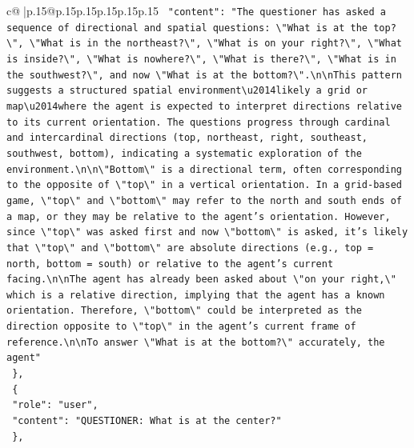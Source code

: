 \documentclass{article}
\begin{document}
{\begin{supertabular}{c@{$\;$}|p{.15\linewidth}@{}p{.15\linewidth}p{.15\linewidth}p{.15\linewidth}p{.15\linewidth}p{.15\linewidth}}
{{{\texttt{    "content": "The questioner has asked a sequence of directional and spatial questions: \textbackslash{}"What is at the top?\textbackslash{}", \textbackslash{}"What is in the northeast?\textbackslash{}", \textbackslash{}"What is on your right?\textbackslash{}", \textbackslash{}"What is inside?\textbackslash{}", \textbackslash{}"What is nowhere?\textbackslash{}", \textbackslash{}"What is there?\textbackslash{}", \textbackslash{}"What is in the southwest?\textbackslash{}", and now \textbackslash{}"What is at the bottom?\textbackslash{}".\textbackslash{}n\textbackslash{}nThis pattern suggests a structured spatial environment\textbackslash{}u2014likely a grid or map\textbackslash{}u2014where the agent is expected to interpret directions relative to its current orientation. The questions progress through cardinal and intercardinal directions (top, northeast, right, southeast, southwest, bottom), indicating a systematic exploration of the environment.\textbackslash{}n\textbackslash{}n\textbackslash{}"Bottom\textbackslash{}" is a directional term, often corresponding to the opposite of \textbackslash{}"top\textbackslash{}" in a vertical orientation. In a grid{-}based game, \textbackslash{}"top\textbackslash{}" and \textbackslash{}"bottom\textbackslash{}" may refer to the north and south ends of a map, or they may be relative to the agent's orientation. However, since \textbackslash{}"top\textbackslash{}" was asked first and now \textbackslash{}"bottom\textbackslash{}" is asked, it's likely that \textbackslash{}"top\textbackslash{}" and \textbackslash{}"bottom\textbackslash{}" are absolute directions (e.g., top = north, bottom = south) or relative to the agent's current facing.\textbackslash{}n\textbackslash{}nThe agent has already been asked about \textbackslash{}"on your right,\textbackslash{}" which is a relative direction, implying that the agent has a known orientation. Therefore, \textbackslash{}"bottom\textbackslash{}" could be interpreted as the direction opposite to \textbackslash{}"top\textbackslash{}" in the agent's current frame of reference.\textbackslash{}n\textbackslash{}nTo answer \textbackslash{}"What is at the bottom?\textbackslash{}" accurately, the agent"} \\
\texttt{  \},} \\
\texttt{  \{} \\
\texttt{    "role": "user",} \\
\texttt{    "content": "QUESTIONER: What is at the center?"} \\
\texttt{  \},} \\
}}}
\end{supertabular}}
\end{document}
